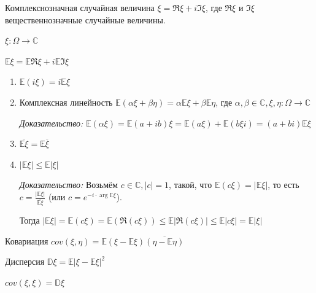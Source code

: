 
\begin{definition}
    Комплекснозначная случайная величина $\xi = \Re \xi + i \Im \xi$, где $\Re \xi$ и $\Im \xi$
    вещественнозначные случайные величины.
\end{definition}

\begin{definition}
    $\xi : \Omega \to \mathbb{C}$

    $\mathbb{E} \xi = \mathbb{E} \Re \xi + i \mathbb{E} \Im \xi$
\end{definition}

\begin{properties}
    \begin{enumerate}
        \item {
            $\mathbb{E} (i \xi) = i \mathbb{E}\xi$
        }
        \item {
            Комплексная линейность $\mathbb{E} (\alpha \xi + \beta \eta) = \alpha \mathbb{E} \xi + \beta \mathbb{E} \eta$, где $\alpha, \beta \in \mathbb{C}, \xi, \eta : \Omega \to \mathbb{C}$

            \textit{Доказательство: } $\mathbb{E} (\alpha \xi) = \mathbb{E} (a + ib)\xi = \mathbb{E} (a \xi) + \mathbb{E} (b\xi i) = (a + bi) \mathbb{E} \xi$
        }
        \item {
            $\overline{\mathbb{E} \xi} = \mathbb{E} \overline{\xi}$
        }
        \item {
            $|\mathbb{E} \xi | \leqslant \mathbb{E} |\xi|$

            \textit{Доказательство: } Возьмём $c \in \mathbb{C}, |c| = 1$, такой, что $\mathbb{E} (c \xi) = |\mathbb{E} \xi|$, то есть $c = \frac{|\mathbb{E} \xi|}{\overline{\mathbb{E} \xi}}$ (или $c = e^{-i \cdot \arg \mathbb{E}\xi}$).

            Тогда $|\mathbb{E} \xi| = \mathbb{E} (c \xi) = \mathbb{E} (\Re (c \xi)) \leqslant \mathbb{E} |\Re (c \xi)| \leqslant \mathbb{E} |c \xi | = \mathbb{E} |\xi|$
        }
    \end{enumerate}
\end{properties}

\begin{definition}
    Ковариация $cov(\xi, \eta) = \mathbb{E} (\xi - \mathbb{E}\xi)\overline{(\eta - \mathbb{E} \eta)}$
\end{definition}

\begin{definition}
    Дисперсия $\mathbb{D} \xi = \mathbb{E} |\xi - \mathbb{E}\xi|^2$

    $cov(\xi, \xi) = \mathbb{D}\xi$
\end{definition}

